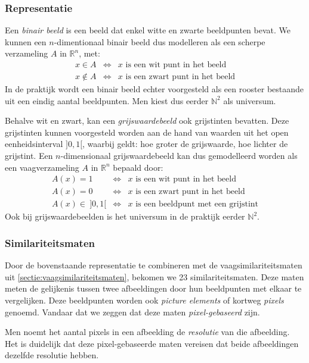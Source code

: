 \subsubsection{Representatie}

Een \emph{binair beeld} is een beeld dat enkel witte en zwarte beeldpunten bevat. We kunnen een 
$n$-dimentionaal binair beeld dus modelleren als een scherpe verzameling $A$ in $\mathbb{R}^n$, met:
$$
\begin{array}{rcl}
x \in A & \iff & x \textrm{ is een wit punt in het beeld} \\
x \notin A & \iff & x \textrm{ is een zwart punt in het beeld}
\end{array}
$$ 
In de praktijk wordt een binair beeld echter voorgesteld als een rooster bestaande uit een
eindig aantal beeldpunten. Men kiest dus eerder $\mathbb{N}^2$ als universum.

Behalve wit en zwart, kan een \emph{grijswaardebeeld} ook grijstinten bevatten. Deze grijstinten
kunnen voorgesteld worden aan de hand van waarden uit het open eenheidsinterval $]0,1[$, waarbij
geldt: hoe groter de grijswaarde, hoe lichter de grijstint. Een $n$-dimensionaal grijswaardebeeld
kan dus gemodelleerd worden als een vaagverzameling $A$ in $\mathbb{R}^n$ bepaald door:
$$
\begin{array}{rcl}
A(x) = 1 & \iff & x \textrm{ is een wit punt in het beeld} \\
A(x) = 0 & \iff & x \textrm{ is een zwart punt in het beeld} \\
A(x) \in\ ]0,1[ & \iff & x \textrm{ is een beeldpunt met een grijstint}
\end{array}
$$
Ook bij grijswaardebeelden is het universum in de praktijk eerder $\mathbb{N}^2$.

\subsubsection{Similariteitsmaten}

Door de bovenstaande representatie te combineren met de vaagsimilariteitsmaten uit 
\ref{sectie:vaagsimilariteitsmaten}, bekomen we 23 similariteitsmaten. Deze maten
meten de gelijkenis tussen twee afbeeldingen door hun beeldpunten met elkaar te vergelijken.
Deze beeldpunten worden ook \emph{picture elements} of kortweg \emph{pixels} genoemd. Vandaar
dat we zeggen dat deze maten \emph{pixel-gebaseerd} zijn.

Men noemt het aantal pixels in een afbeelding de \emph{resolutie} van die afbeelding. Het is
duidelijk dat deze pixel-gebaseerde maten vereisen dat beide afbeeldingen dezelfde resolutie 
hebben.


